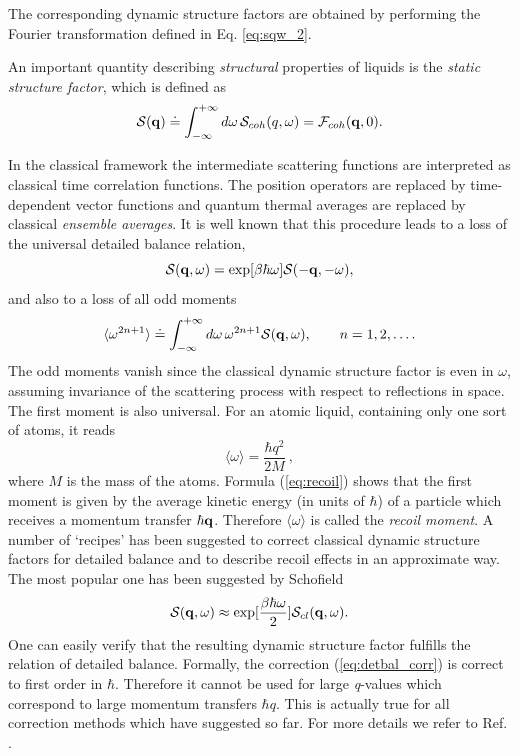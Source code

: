 \documentclass[a4paper,11pt]{report}
\newcommand{\qval}{\textit{q}}
\begin{document}
The corresponding dynamic structure factors are obtained by performing the Fourier transformation defined in 
Eq. \ref{eq:sqw_2}.

An important quantity describing {\em structural} properties of liquids is the {\em static structure factor}, which 
is defined as
\begin{equation}
\label{eq:sq}
{\cal S}({\bf q}) \doteq \int_{-\infty}^{+\infty}d\omega\,
{\cal S}_{coh}(q,\omega) = {\cal F}_{coh}({\bf q},0).
\end{equation}

In the classical framework the intermediate scattering functions are interpreted as classical time correlation functions. 
The position operators are replaced by time-dependent vector functions and quantum thermal averages are replaced by classical 
{\em ensemble averages}. It is well known that this procedure leads to a loss of the universal detailed balance relation,
\begin{equation}
\label{eq:detbal}
{\cal S}({\bf q},\omega) = \exp[\beta\hbar\omega]
{\cal S}(-{\bf q},-\omega),
\end{equation}
and also to a loss of all odd moments
\begin{equation}
\label{eq:moments}
\langle\omega^{2n+1}\rangle \doteq
\int_{-\infty}^{+\infty}d\omega\,\omega^{2n+1} {\cal S}({\bf
q},\omega), \qquad n = 1,2,\ldots.
\end{equation}
The odd moments vanish since the classical dynamic structure factor is even in $\omega$, assuming invariance of the scattering 
process with respect to reflections in space. The first moment is also universal. For an atomic liquid, containing only one 
sort of atoms, it reads
\begin{equation}
\label{eq:recoil}
\langle\omega\rangle = \frac{\hbar q^2}{2M}\:,
\end{equation} 
where $M$ is the mass of the atoms.  Formula (\ref{eq:recoil}) shows that the first moment is given by the average kinetic 
energy (in units of $\hbar$) of a particle  which receives a momentum transfer 
$\hbar {\bf q}$. Therefore $\langle\omega\rangle$ is called  the {\em recoil moment}. A number of `recipes' has been 
suggested to correct classical dynamic structure factors for detailed balance and to describe recoil effects in an 
approximate way. The most popular one has been suggested by Schofield \cite{Schofield}
\begin{equation}
\label{eq:detbal_corr}
{\cal S}({\bf q},\omega) \approx
\exp[\frac{\beta\hbar\omega}{2}]{\cal S}_{cl}({\bf q},\omega).
\end{equation}
One can easily verify that the resulting dynamic structure factor fulfills the relation of detailed balance. Formally, the 
correction (\ref{eq:detbal_corr}) is correct to first order in $\hbar$. Therefore it cannot be used for large \qval-values which 
correspond to large momentum transfers  $\hbar q$. This is actually true for all correction methods which have suggested so far. 
For more details we refer to Ref. \cite{Kneller:1994}.
\end{document}
